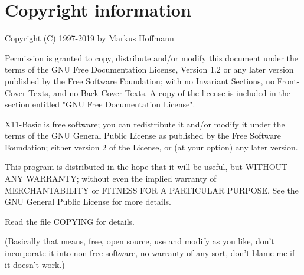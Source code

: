 \section*{Copyright information}

Copyright (C) 1997-2019 by Markus Hoffmann 

Permission is granted to copy, distribute and/or modify this document
under the terms of the GNU Free Documentation License, Version 1.2
or any later version published by the Free Software Foundation;
with no Invariant Sections, no Front-Cover Texts, and no Back-Cover Texts.
A copy of the license is included in the section entitled "GNU
Free Documentation License".

X11-Basic is free software; you can redistribute it and/or modify it under the
terms of the GNU General Public License as published by the Free Software
Foundation; either version 2 of the License, or (at your option) any later
version.

This program is distributed in the hope that it will be useful, but WITHOUT ANY
WARRANTY; without even the implied warranty of MERCHANTABILITY or FITNESS FOR
A PARTICULAR PURPOSE. See the GNU General Public License for more details.

Read the file COPYING for details.

(Basically that means, free, open source, use and modify as you like, don't
incorporate it into non-free software, no warranty of any sort, don't blame me
if it doesn't work.)
